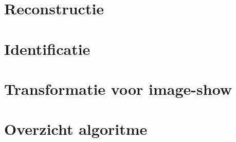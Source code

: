 \documentclass[a4paper,11pt]{article}
\begin{document}
\section{Reconstructie}\label{sec:reconstructie}


\section{Identificatie}\label{sec:identificatie}


\section{Transformatie voor image-show}\label{sec:transformatie}








\newpage
{}



\newpage
\appendix
\renewcommand\thefigure{\thesection.\arabic{figure}}   
\setcounter{figure}{0} 
\section{Overzicht algoritme}
\end{document}
